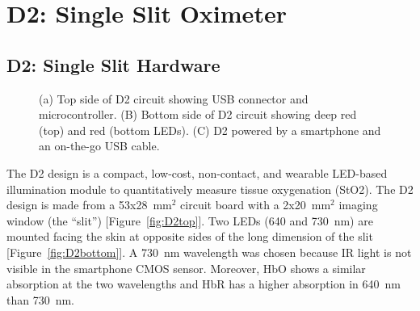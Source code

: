 \section{D2: Single Slit Oximeter}
\subsection{D2: Single Slit Hardware}
\begin{figure}
    \begin{center}
    \end{center}
    \caption{(a) Top side of D2 circuit showing USB connector and microcontroller. (B) Bottom side of D2 circuit showing deep red (top) and red (bottom LEDs). (C) D2 powered by a smartphone and an on-the-go USB cable.} 
    \label{fig:D2hardware}
\end{figure} 
The D2 design is a compact, low-cost, non-contact, and wearable LED-based illumination module to quantitatively measure tissue oxygenation (StO2). The D2 design is made from a 53x28~mm$^2$ circuit board with a 2x20~mm$^2$ imaging window (the ``slit'') [Figure~\ref{fig:D2top}]. Two LEDs (640 and 730~nm) are mounted facing the skin at opposite sides of the long dimension of the slit [Figure~\ref{fig:D2bottom}]. A 730~nm wavelength was chosen because IR light is not visible in the smartphone CMOS sensor. Moreover, HbO shows a similar absorption at the two wavelengths and HbR has a higher absorption in 640~nm than 730~nm. 

